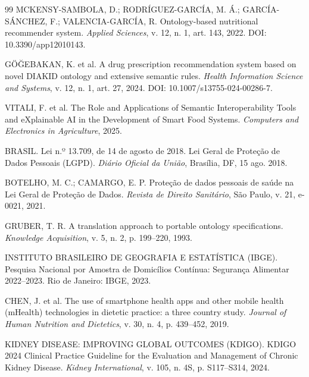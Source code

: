 \documentclass[12pt, a4paper, twocolumn]{article}
\begin{document}
\begin{thebibliography}{99}
    MCKENSY-SAMBOLA, D.; RODRÍGUEZ-GARCÍA, M. Á.; GARCÍA-SÁNCHEZ, F.; VALENCIA-GARCÍA, R. Ontology-based nutritional recommender system. \textit{Applied Sciences}, v. 12, n. 1, art. 143, 2022. DOI: 10.3390/app12010143.

    GÖĞEBAKAN, K. et al. A drug prescription recommendation system based on novel DIAKID ontology and extensive semantic rules. \textit{Health Information Science and Systems}, v. 12, n. 1, art. 27, 2024. DOI: 10.1007/s13755-024-00286-7.

    VITALI, F. et al. The Role and Applications of Semantic Interoperability Tools and eXplainable AI in the Development of Smart Food Systems. \textit{Computers and Electronics in Agriculture}, 2025.

    BRASIL. Lei n.º 13.709, de 14 de agosto de 2018. Lei Geral de Proteção de Dados Pessoais (LGPD). \textit{Diário Oficial da União}, Brasília, DF, 15 ago. 2018.

    BOTELHO, M. C.; CAMARGO, E. P. Proteção de dados pessoais de saúde na Lei Geral de Proteção de Dados. \textit{Revista de Direito Sanitário}, São Paulo, v. 21, e-0021, 2021.

    GRUBER, T. R. A translation approach to portable ontology specifications. \textit{Knowledge Acquisition}, v. 5, n. 2, p. 199--220, 1993.

    INSTITUTO BRASILEIRO DE GEOGRAFIA E ESTATÍSTICA (IBGE). Pesquisa Nacional por Amostra de Domicílios Contínua: Segurança Alimentar 2022--2023. Rio de Janeiro: IBGE, 2023.

    CHEN, J. et al. The use of smartphone health apps and other mobile health (mHealth) technologies in dietetic practice: a three country study. \textit{Journal of Human Nutrition and Dietetics}, v. 30, n. 4, p. 439--452, 2019.

    KIDNEY DISEASE: IMPROVING GLOBAL OUTCOMES (KDIGO). KDIGO 2024 Clinical Practice Guideline for the Evaluation and Management of Chronic Kidney Disease. \textit{Kidney International}, v. 105, n. 4S, p. S117--S314, 2024.

\end{thebibliography}
\end{document}
